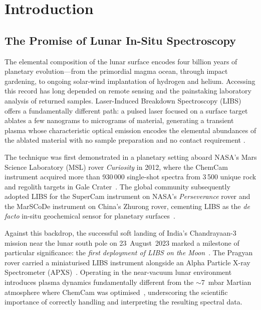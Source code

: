 \documentclass[a4paper,twocolumn,10pt]{article}
\begin{document}

\section{Introduction}
\label{sec:intro}

\subsection{The Promise of Lunar In-Situ Spectroscopy}

The elemental composition of the lunar surface encodes four billion
years of planetary evolution---from the primordial magma ocean, through
impact gardening, to ongoing solar-wind implantation of hydrogen and
helium.  Accessing this record has long depended on remote sensing and
the painstaking laboratory analysis of returned samples.  Laser-Induced
Breakdown Spectroscopy (LIBS) offers a fundamentally different path: a
pulsed laser focused on a surface target ablates a few nanograms to
micrograms of material, generating a transient plasma whose
characteristic optical emission encodes the elemental abundances of the
ablated material with no sample preparation and no contact requirement
\cite{Cremers2006,Wiens2012}.

The technique was first demonstrated in a planetary setting aboard
NASA's Mars Science Laboratory (MSL) rover \emph{Curiosity} in 2012,
where the ChemCam instrument acquired more than 930\,000 single-shot
spectra from 3\,500 unique rock and regolith targets in Gale
Crater~\cite{Wiens2012,Maurice2012,Gasnault2023}.  The global
community subsequently adopted LIBS for the SuperCam instrument on
NASA's \emph{Perseverance} rover and the MarSCoDe instrument on
China's Zhurong rover, cementing LIBS as the \emph{de facto} in-situ
geochemical sensor for planetary surfaces~\cite{Wiens2020,Xu2021}.

Against this backdrop, the successful soft landing of India's
Chandrayaan-3 mission near the lunar south pole on 23~August~2023
marked a milestone of particular significance: the \emph{first
deployment of LIBS on the Moon}~\cite{ISROCh3}.  The Pragyan rover
carried a miniaturised LIBS instrument alongside an Alpha Particle
X-ray Spectrometer (APXS)~\cite{Laxmiprasad2020}.  Operating in the
near-vacuum lunar environment introduces plasma dynamics fundamentally
different from the $\sim$7~mbar Martian atmosphere where ChemCam was
optimised~\cite{Saeidfirozeh2024}, underscoring the scientific
importance of correctly handling and interpreting the resulting spectral
data.
\end{document}
